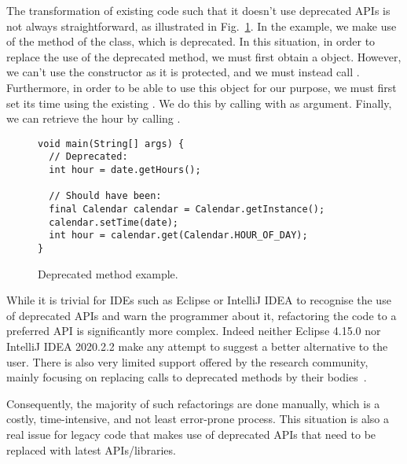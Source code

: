 \documentclass[sigconf,review,anonymous]{acmart}
\begin{document}
The transformation of existing code such that it doesn't use deprecated APIs
is not always straightforward,
as illustrated in Fig.~\ref{ex:deprecated-method-other}. In the example, we
make use of the  method of the  class,
which is deprecated.
In this situation, in order to replace the use of the deprecated method,
we must first obtain a  object.
However, we can't use the  constructor as it is protected,
and we must instead call .
Furthermore, in order to be able to use this  object for our purpose,
we must first set its time using the existing .
We do this by calling  with  as argument.
Finally, we can retrieve the hour by calling
.

\begin{figure}
\begin{lstlisting}[mathescape=true,showstringspaces=false]
void main(String[] args) {
  // Deprecated:
  int hour = date.getHours();
  
  // Should have been:
  final Calendar calendar = Calendar.getInstance();
  calendar.setTime(date);
  int hour = calendar.get(Calendar.HOUR_OF_DAY);
}
\end{lstlisting}
\caption{Deprecated method example.}
\label{ex:deprecated-method-other}
\end{figure}


While it is trivial for IDEs such as Eclipse or IntelliJ IDEA to
recognise the use of deprecated APIs and warn the programmer about it,
refactoring the code to a preferred API is significantly more
complex. Indeed neither Eclipse 4.15.0 nor IntelliJ IDEA 2020.2.2 make
any attempt to suggest a better alternative to the user. There is also
very limited support offered by the research community, mainly
focusing on replacing calls to deprecated methods by their
bodies~\cite{DBLP:conf/paste/Perkins05}. 

Consequently, the majority of
such refactorings are done manually, which is a costly,
time-intensive, and not least error-prone process.  This situation is
also a real issue for legacy code that makes use of deprecated APIs
that need to be replaced with latest APIs/libraries.
\end{document}
